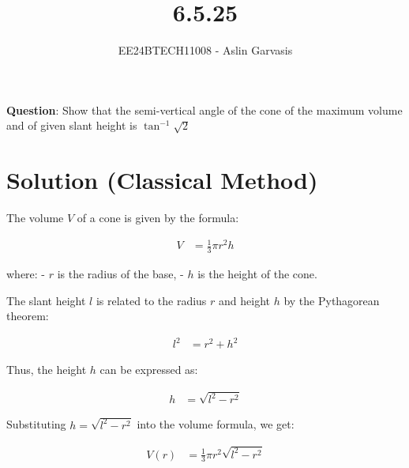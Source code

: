 \documentclass[journal]{IEEEtran}
\begin{document}
	
	
	\vspace{3cm}
	
	\title{6.5.25}
	\author{EE24BTECH11008 - Aslin Garvasis}
	{\let\newpage\relax\maketitle}
	
	\renewcommand{\thefigure}{\theenumi}
	\renewcommand{\thetable}{\theenumi}
	\setlength{\intextsep}{10pt} %
	
	
	\renewcommand{\thetable}{\theenumi}
	
	
	\textbf{Question}:\newline
	Show that the semi-vertical angle of the cone of the maximum volume and of given slant height is $\tan^{-1}\sqrt{2}$ \\
	


\section*{Solution (Classical Method)}

The volume \( V \) of a cone is given by the formula:

\begin{align}
V &= \frac{1}{3} \pi r^2 h
\end{align}

where:
- \( r \) is the radius of the base,
- \( h \) is the height of the cone.

The slant height \( l \) is related to the radius \( r \) and height \( h \) by the Pythagorean theorem:

\begin{align}
l^2 &= r^2 + h^2
\end{align}

Thus, the height \( h \) can be expressed as:

\begin{align}
h &= \sqrt{l^2 - r^2}
\end{align}

Substituting \( h = \sqrt{l^2 - r^2} \) into the volume formula, we get:

\begin{align}
V(r) &= \frac{1}{3} \pi r^2 \sqrt{l^2 - r^2}
\end{align}
\end{document}

